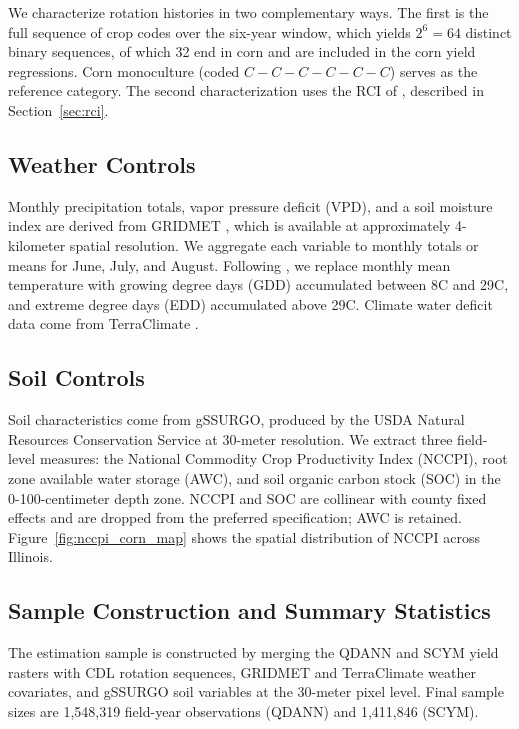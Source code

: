 \documentclass[12pt,letterpaper]{article}
\theoremstyle{remark}
\theoremstyle{plain}
\theoremstyle{definition}
\begin{document}
We characterize rotation histories in two complementary ways. The first is the full sequence of crop codes over the six-year window, which yields $2^6 = 64$ distinct binary sequences, of which 32 end in corn and are included in the corn yield regressions. Corn monoculture (coded $C-C-C-C-C-C$) serves as the reference category. The second characterization uses the RCI of \citet{socolar2021}, described in Section~\ref{sec:rci}.

\subsection{\label{subsec:w_controls}Weather Controls}
Monthly precipitation totals, vapor pressure deficit (VPD), and a soil moisture index are derived from GRIDMET \citep{abatzoglou2013}, which is available at approximately 4-kilometer spatial resolution. We aggregate each variable to monthly totals or means for June, July, and August. Following \citet{SchlenkerRoberts2009}, we replace monthly mean temperature with growing degree days (GDD) accumulated between 8\textdegree C and 29\textdegree C, and extreme degree days (EDD) accumulated above 29\textdegree C. Climate water deficit data come from TerraClimate \citep{abatzoglou2018}.

\subsection{\label{subsec:soil_controls}Soil Controls}
Soil characteristics come from gSSURGO, produced by the USDA Natural Resources Conservation Service at 30-meter resolution. We extract three field-level measures: the National Commodity Crop Productivity Index (NCCPI), root zone available water storage (AWC), and soil organic carbon stock (SOC) in the 0-100-centimeter depth zone. NCCPI and SOC are collinear with county fixed effects and are dropped from the preferred specification; AWC is retained. Figure~\ref{fig:nccpi_corn_map} shows the spatial distribution of NCCPI across Illinois.

\subsection{\label{subsec:smaple_const}Sample Construction and Summary Statistics}
The estimation sample is constructed by merging the QDANN and SCYM yield rasters with CDL rotation sequences, GRIDMET and TerraClimate weather covariates, and gSSURGO soil variables at the 30-meter pixel level. Final sample sizes are 1,548,319 field-year observations (QDANN) and 1,411,846 (SCYM).
\end{document}
